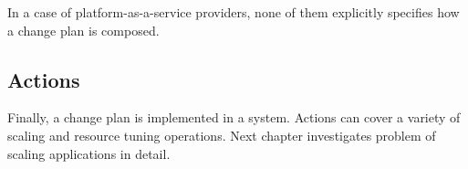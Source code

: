 In a case of platform-as-a-service providers, none of them explicitly specifies how a change plan is composed.

\subsection{Actions}
Finally, a change plan is implemented in a system. Actions can cover a variety of scaling and resource tuning operations. Next chapter investigates problem of scaling applications in detail.
